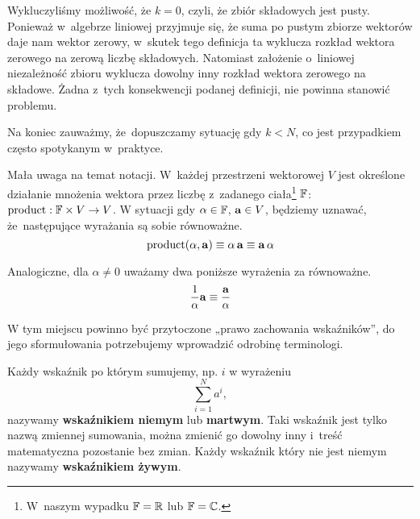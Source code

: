 \documentclass[a4paper,11pt]{article}
\begin{document}
Wykluczyliśmy możliwość, że $k = 0$, czyli, że zbiór składowych jest pusty.
Ponieważ w~algebrze liniowej przyjmuje się, że suma po pustym zbiorze
wektorów daje nam wektor zerowy, w~skutek tego definicja ta wyklucza rozkład
wektora zerowego na zerową liczbę składowych. Natomiast założenie o~liniowej
niezależność zbioru wyklucza dowolny inny rozkład wektora zerowego na
składowe. Żadna z~tych konsekwencji podanej definicji, nie powinna stanowić
problemu.

Na koniec zauważmy, że~dopuszczamy sytuację gdy $k < N$, co jest przypadkiem
często spotykanym w~praktyce.

\vspace{\spaceFour}



 Mała uwaga na temat notacji. W~każdej przestrzeni wektorowej $V$
jest określone działanie mnożenia wektora przez liczbę z~zadanego
ciała\footnote{W~naszym wypadku $\mathbb{F} = \mathbb{R}$ lub $\mathbb{F} = \mathbb{C}$.} $\mathbb{F}$:
$\textrm{product} : \mathbb{F} \times V \to V$. W sytuacji gdy $\alpha \in \mathbb{F}$,
$\mathbf{a} \in V$, będziemy uznawać, że~następujące wyrażania są sobie
równoważne.
\begin{equation}
  \label{eq:SkalmierskiMechanika-03}
  \textrm{product}( \alpha, \mathbf{a} ) \equiv \alpha \, \mathbf{a} \equiv \mathbf{a} \, \alpha
\end{equation}

Analogiczne, dla $\alpha \neq 0$ uważamy dwa poniższe wyrażenia za równoważne.
\begin{equation}
  \label{eq:SkalmierskiMechanika-04}
  \frac{ 1 }{ \alpha } \mathbf{a} \equiv \frac{ \mathbf{a} }{ \alpha }
\end{equation}

\vspace{\spaceFour}



 W tym miejscu powinno być przytoczone „prawo zachowania wskaźników”, do jego sformułowania potrzebujemy wprowadzić odrobinę terminologi.

Każdy wskaźnik po którym sumujemy, np. $i$ w wyrażeniu
\begin{equation}
  \label{eq:SkalmierskiMechanika-05}
  \sum_{ i = 1 }^{ N } a^{ i },
\end{equation}
nazywamy \textbf{wskaźnikiem niemym} lub \textbf{martwym}. Taki wskaźnik
jest tylko nazwą zmiennej sumowania, można zmienić go dowolny inny i~treść
matematyczna pozostanie bez zmian. Każdy wskaźnik który nie jest niemym
nazywamy \textbf{wskaźnikiem żywym}.
\end{document}
